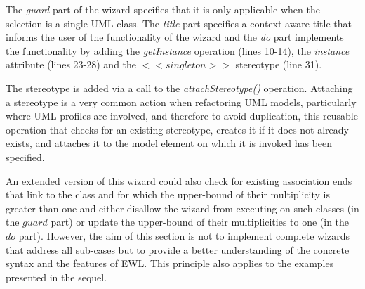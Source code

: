 The \emph{guard} part of the wizard specifies that it is only applicable when the selection is a single UML class. The \emph{title} part specifies a context-aware title that informs the user of the functionality of the wizard and the \emph{do} part implements the functionality by adding the \emph{getInstance} operation (lines 10-14), the \emph{instance} attribute (lines 23-28) and the $<<singleton>>$ stereotype (line 31). 

The stereotype is added via a call to the \emph{attachStereotype()} operation. Attaching a stereotype is a very common action when refactoring UML models, particularly where UML profiles are involved, and therefore to avoid duplication, this reusable operation that checks for an existing stereotype, creates it if it does not already exists, and attaches it to the model element on which it is invoked has been specified.

An extended version of this wizard could also check for existing association ends that link to the class and for which the upper-bound of their multiplicity is greater than one and either disallow the wizard from executing on such classes (in the $guard$ part) or update the upper-bound of their multiplicities to one (in the $do$ part). However, the aim of this section is not to implement complete wizards that address all sub-cases but to provide a better  understanding of the concrete syntax and the features of EWL. This principle also applies to the examples presented in the sequel.